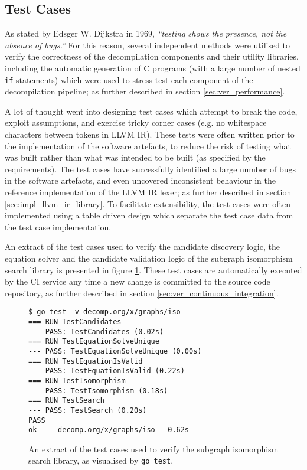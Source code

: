 
\subsection{Test Cases}

As stated by Edsger W. Dijkstra in 1969, \textit{``testing shows the presence, not the absence of bugs.''} \cite{absence_of_bugs_quote} For this reason, several independent methods were utilised to verify the correctness of the decompilation components and their utility libraries, including the automatic generation of C programs (with a large number of nested \texttt{if}-statements) which were used to stress test each component of the decompilation pipeline; as further described in section \ref{sec:ver_performance}.

A lot of thought went into designing test cases which attempt to break the code, exploit assumptions, and exercise tricky corner cases (e.g. no whitespace characters between tokens in LLVM IR). These tests were often written prior to the implementation of the software artefacts, to reduce the risk of testing what was built rather than what was intended to be built (as specified by the requirements). The test cases have successfully identified a large number of bugs in the software artefacts, and even uncovered inconsistent behaviour in the reference implementation of the LLVM IR lexer; as further described in section \ref{sec:impl_llvm_ir_library}. To facilitate extensibility, the test cases were often implemented using a table driven design which separate the test case data from the test case implementation.

An extract of the test cases used to verify the candidate discovery logic, the equation solver and the candidate validation logic of the subgraph isomorphism search library is presented in figure \ref{fig:iso_test_cases}. These test cases are automatically executed by the CI service any time a new change is committed to the source code repository, as further described in section \ref{sec:ver_continuous_integration}.

\begin{figure}[htbp]
	\begin{center}
		\begin{verbatim}
$ go test -v decomp.org/x/graphs/iso
=== RUN TestCandidates
--- PASS: TestCandidates (0.02s)
=== RUN TestEquationSolveUnique
--- PASS: TestEquationSolveUnique (0.00s)
=== RUN TestEquationIsValid
--- PASS: TestEquationIsValid (0.22s)
=== RUN TestIsomorphism
--- PASS: TestIsomorphism (0.18s)
=== RUN TestSearch
--- PASS: TestSearch (0.20s)
PASS
ok     decomp.org/x/graphs/iso   0.62s
		\end{verbatim}
		\caption{An extract of the test cases used to verify the subgraph isomorphism search library, as visualised by \texttt{go test}.}
		\label{fig:iso_test_cases}
	\end{center}
\end{figure}



